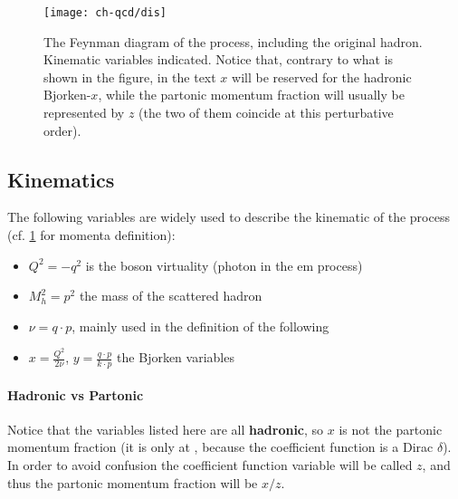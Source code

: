 
\begin{figure}
	\centering
	\texttt{[image: ch-qcd/dis]}
	\caption{
    The \lo Feynman diagram of the \dis process, including the original hadron.
    Kinematic variables indicated. Notice that, contrary to what is shown in
    the figure, in the text $x$ will be reserved for the hadronic Bjorken-$x$,
    while the partonic momentum fraction will usually be represented by $z$
    (the two of them coincide at this perturbative order).
  }
	\label{fig:dis/dis}
\end{figure}

\subsection{Kinematics}

The following variables are widely used to describe the kinematic of the \dis
process (cf. \cref{fig:dis/dis} for momenta definition):
\begin{itemize}
  \item $Q^2 = - q^2$ is the \ew boson virtuality (photon in the \acrshort{em}
    process)
  \item $M_h^2 = p^2$ the mass of the scattered hadron
  \item $\nu = q \cdot p$, mainly used in the definition of the following
  \item $x = \frac{Q^2}{2\nu}$, $y = \frac{q \cdot p}{k \cdot p}$ the Bjorken
    variables
\end{itemize}

\paragraph{Hadronic vs Partonic} Notice that the variables listed here
are all \textbf{hadronic}, so $x$ is not the partonic momentum fraction (it is only
at \lo , because the coefficient function is a Dirac $\delta$).
In order to avoid confusion the coefficient function variable will be called
$z$, and thus the partonic momentum fraction will be $x/z$.
\newline

